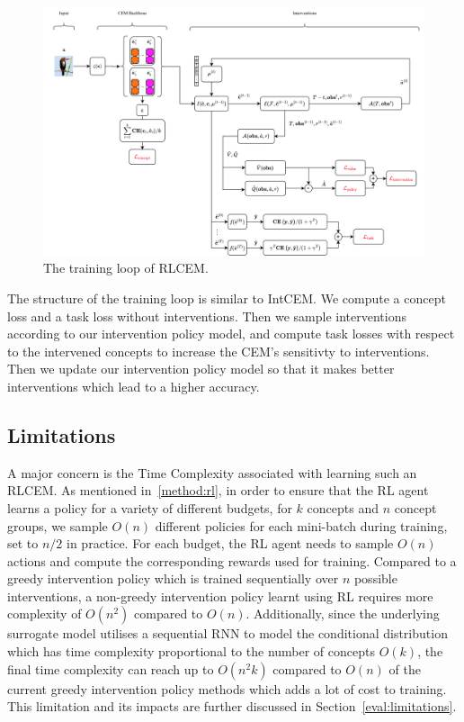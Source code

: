 \begin{figure}
    \centering
    \includegraphics*[width=\textwidth]{figs/method/rlcem.png}
    \caption{The training loop of RLCEM.}
    \label{fig:rlcem}
\end{figure}

The structure of the training loop is similar to IntCEM.
 We compute a concept loss
and a task loss without interventions.
Then we sample interventions according to our intervention policy model,
and compute task losses with respect to the intervened concepts to increase 
the CEM's sensitivty to interventions. Then we update our intervention policy
model so that it makes better interventions which lead to a higher accuracy.

\subsection{Limitations}

A major concern is the Time Complexity associated with learning
such an RLCEM. As mentioned in~\ref{method:rl}, in order to ensure
that the RL agent learns a policy for a variety of different budgets,
for $k$ concepts and $n$ concept groups,
 we sample $O(n)$ different policies for each mini-batch during training, set 
to $n/2$ in practice. For each budget, the RL agent needs to sample
$O(n)$ actions and compute the corresponding rewards used for training. 
Compared to
a greedy intervention policy which is trained sequentially over
$n$ possible interventions, 
a non-greedy intervention policy learnt using
RL requires more complexity of $O(n^2)$ compared to $O(n)$.
Additionally, since the underlying surrogate model utilises a sequential
RNN to model the conditional distribution which has time complexity
proportional to the number of concepts $O(k)$, the final 
time complexity can reach up to $O(n^2k)$ compared to $O(n)$ of the current
greedy intervention policy methods which adds a lot of cost to training.
This limitation
and its impacts
are further discussed in Section~\ref{eval:limitations}.\\

